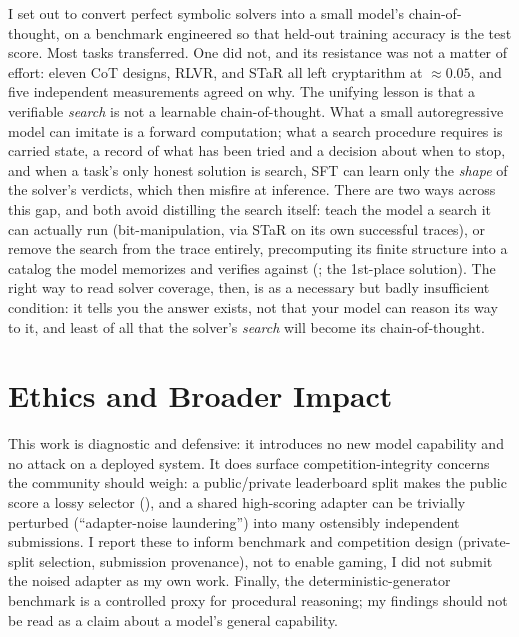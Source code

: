 \documentclass[11pt]{article}
\begin{document}
I set out to convert perfect symbolic solvers into a small model's chain-of-thought, on a
benchmark engineered so that held-out training accuracy is the test score. Most tasks
transferred. One did not, and its resistance was not a matter of effort: eleven CoT designs,
RLVR, and STaR all left cryptarithm at $\approx\!0.05$, and five independent measurements
agreed on why. The unifying lesson is that a verifiable \emph{search} is not a learnable
chain-of-thought. What a small autoregressive model can imitate is a forward computation;
what a search procedure requires is carried state, a record of what has been tried and a
decision about when to stop, and when a task's only honest solution is search, SFT can
learn only the \emph{shape} of the solver's verdicts, which then misfire at inference. There are
two ways across this gap, and both avoid distilling the search itself: teach the model a search it
can actually run (bit-manipulation, via STaR on its own successful traces), or remove the search
from the trace entirely, precomputing its finite structure into a catalog the model memorizes and
verifies against (; the 1st-place solution). The right way to read solver coverage,
then, is as a necessary but badly insufficient condition: it tells you the answer exists, not that
your model can reason its way to it, and least of all that the solver's \emph{search} will become
its chain-of-thought.

\section*{Ethics and Broader Impact}
This work is diagnostic and defensive: it introduces no new model capability and no attack on
a deployed system. It does surface competition-integrity concerns the community should weigh:
a public/private leaderboard split makes the public score a lossy selector (),
and a shared high-scoring adapter can be trivially perturbed (``adapter-noise laundering'')
into many ostensibly independent submissions. I report these to inform benchmark and
competition design (private-split selection, submission provenance), not to enable
gaming, I did not submit the noised adapter as my own work. Finally, the
deterministic-generator benchmark is a controlled proxy for procedural reasoning; my
findings should not be read as a claim about a model's general capability.

\end{document}
